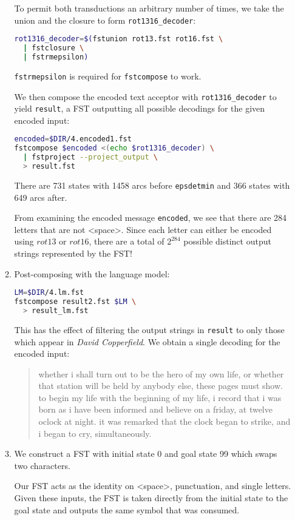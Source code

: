 \documentclass[a4paper,oneside,reqno]{amsart}
\begin{document}
\begin{enumerate}[label=\arabic*.]
\begin{enumerate}[label=(\alph*)]
    To permit both transductions an arbitrary number of times, we take the
    union and the closure to form \texttt{rot1316\_decoder}:
    \begin{lstlisting}[language=bash]
rot1316_decoder=$(fstunion rot13.fst rot16.fst \
  | fstclosure \
  | fstrmepsilon)
    \end{lstlisting}
    \texttt{fstrmepsilon} is required for \texttt{fstcompose} to work.

    We then compose the encoded text acceptor with \texttt{rot1316\_decoder} to
    yield \texttt{result}, a FST outputting all possible decodings for the
    given encoded input:
    \begin{lstlisting}[language=bash]
encoded=$DIR/4.encoded1.fst
fstcompose $encoded <(echo $rot1316_decoder) \
  | fstproject --project_output \
  > result.fst
    \end{lstlisting}
    There are 731 states with 1458 arcs before \texttt{epsdetmin} and
    366 states with 649 arcs after.

    From examining the encoded message \texttt{encoded}, we see that there are
    284 letters that are not <space>.  Since each letter can either be
    encoded using $rot13$ or $rot16$, there are a total of $2^{284}$ possible
    distinct output strings represented by the FST!

  \item Post-composing with the language model:
    \begin{lstlisting}[language=bash]
LM=$DIR/4.lm.fst
fstcompose result2.fst $LM \
  > result_lm.fst
    \end{lstlisting}
    This has the effect of filtering the output strings in \texttt{result} to only
    those which appear in \emph{David Copperfield}. We obtain a single decoding
    for the encoded input:
    \begin{quote}
      whether i shall turn out to be the hero of my own life, or whether that
      station will be held by anybody else, these pages must show. to begin my
      life with the beginning of my life, i record that i was born as i have
      been informed and believe on a friday, at twelve oclock at night. it was
      remarked that the clock began to strike, and i began to cry,
      simultaneously.
    \end{quote}

  \item We construct a FST with initial state 0 and goal state 99 which swaps two characters.

    Our FST acts as the identity on <space>, punctuation, and single letters.
    Given these inputs, the FST is taken directly from the initial state to
    the goal state and outputs the same symbol that was consumed.


\end{enumerate}
\end{enumerate}
\end{document}
